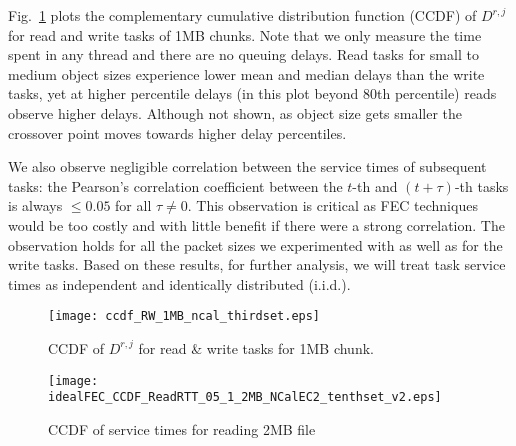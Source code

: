 \documentclass[journal]{IEEEtran}
\begin{document}
Fig.~\ref{fig:ccdf} plots the complementary cumulative distribution function (CCDF) of $D^{r,j}$ for read and write  tasks of 1MB chunks. Note that we only measure the time spent in any thread and there are no queuing delays. Read tasks for small to medium object sizes experience lower mean and median delays than the write tasks, yet at higher percentile delays (in this plot beyond 80th percentile) reads observe higher delays. Although not shown, as object size gets smaller the crossover point moves towards higher delay percentiles.


We also observe negligible correlation between the service times of subsequent tasks: the Pearson's correlation coefficient between the $t$-th and $(t+\tau)$-th tasks is always $\le 0.05$ for all $\tau\neq 0$.
This observation is critical as FEC techniques would be too costly and with little benefit if there were a strong correlation. The observation holds for all the packet sizes we experimented with as well as for the write tasks. Based on these results, for further analysis, we will treat task service times as independent and identically distributed (i.i.d.). 



\begin{figure}[!t]
\centering
\texttt{[image: ccdf\_RW\_1MB\_ncal\_thirdset.eps]}
\vspace{-10pt}
\caption{CCDF of $D^{r,j}$ for read \& write tasks for 1MB chunk.}
\label{fig:ccdf}
\vspace{-10pt}
\end{figure}


\begin{figure}[!t]
\centering
\texttt{[image: idealFEC\_CCDF\_ReadRTT\_05\_1\_2MB\_NCalEC2\_tenthset\_v2.eps]}
\vspace{-10pt}
\caption{CCDF of service times for reading 2MB file} 
\label{fig:servicetimes}
\vspace{-10pt}
\end{figure}
\end{document}

